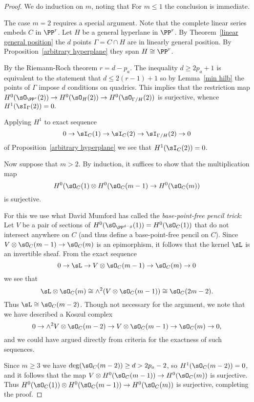 \begin{proof} We do induction on $m$, noting that
For $m\leq 1$ the conclusion is immediate. 

The case $m=2$ requires a special argument. Note that the complete linear series
embeds $C$ in $\PP^{r}$.  Let $H$ be a general hyperlane in $\PP^{r}$.
 By Theorem~\ref{linear general position} the $d$ points $\Gamma = C\cap H$ are in linearly general position. By Proposition~\ref{arbitrary hyperplane} they span $H \cong \PP^{r}$.
 
By the Riemann-Roch theorem $r = d-p_a$. The inequality $d\geq 2p_a+1$ is equivalent to the statement that $d\leq 2(r-1)+1$ so by Lemma~\ref{min hilb} the points of $\Gamma$ impose $d$ conditions on quadrics.
This implies that
the restriction map $H^0(\sO_{\PP^{r}}(2))\to H^0(\sO_H(2)) \to H^0(\sO_{\Gamma/H}(2))$ is surjective, whence $H^1(\sI_\Gamma(2)) = 0.$

Applying $H^1$ to exact sequence 
$$
0\to \sI_C(1) \to \sI_C(2) \to \sI_{\Gamma/H}(2) \to 0
$$
of Proposition~\ref{arbitrary hyperplane}
we see that $H^1(\sI_C(2))=0$.

Now suppose that  $m>2$. By induction, it suffices to show that the multiplication map
$$
H^0(\sO_C(1) \otimes H^0(\sO_C(m-1)\to H^0(\sO_{C}(m))
$$
is surjective.

For this we use what David Mumford has called the \emph{base-point-free pencil trick}:
Let $V$ be a pair of sections of $H^0(\sO_{\PP^{d-g}}(1)) = H^0(\sO_C(1))$ that do not intersect anywhere on $C$ (and thus define a base-point-free pencil on $C$).
Since $V\otimes \sO_{C}(m-1)\to \sO_{C}(m)$ is an epimorphism, it follows that the kernel $\sL$ is an invertible sheaf.
From the exact sequence
$$
0\to \sL \to V\otimes \sO_{C}(m-1) \to \sO_{C}(m) \to 0
$$
we see that
$$
\sL \otimes \sO_{C}(m) \cong  \wedge^2(V\otimes \sO_{C}(m-1))\cong \sO_C(2m-2).
$$
Thus $\sL \cong \sO_C(m-2)$.
Though not necessary for the argument, we note that we have described a Koszul complex
$$
0\to \wedge^2V \otimes \sO_C(m-2) \to V\otimes \sO_{C}(m-1)\to \sO_{C}(m)\to 0,
$$
and we could have argued directly from criteria for the exactness of such sequences.

Since $m\geq 3$ we have $\deg(\sO_C(m-2)) \geq d > 2p_a-2$, so $H^1(\sO_C(m-2)) =0$, and it follows that the map $V\otimes H^0(\sO_{C}(m-1))\to H^0(\sO_{C}(m))$
is surjective. Thus  
$H^0(\sO_C(1))\otimes H^0(\sO_{C}(m-1))\to H^0(\sO_{C}(m))$
is surjective, completing the proof.
\end{proof}


